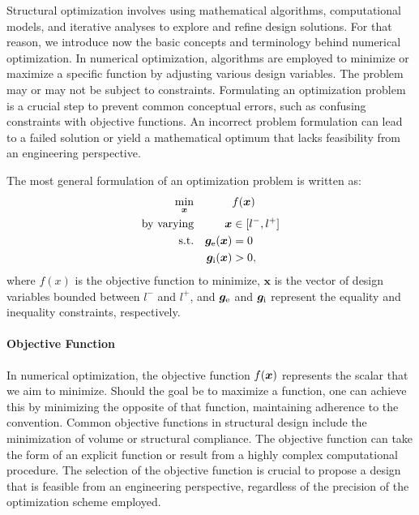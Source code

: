 Structural optimization involves using mathematical algorithms, computational models, and iterative analyses to explore and refine design solutions. For that reason, we introduce now the basic concepts and terminology behind numerical optimization. In numerical optimization, algorithms are employed to minimize or maximize a specific function by adjusting various design variables. The problem may or may not be subject to constraints. Formulating an optimization problem is a crucial step to prevent common conceptual errors, such as confusing constraints with objective functions. An incorrect problem formulation can lead to a failed solution or yield a mathematical optimum that lacks feasibility from an engineering perspective.

The most general formulation of an optimization problem is written as:
\begin{equation}
    \begin{aligned}
    \min_{\bm{x}}         && & f(\bm{x})\\
    \textrm{by varying}   && \bm{x} &\in [l^-,l^+] \\
    \textrm{s.t.}   && \bm{g}_\text{e}(\bm{x}) &= 0 \\
    && \bm{g}_\text{i}(\bm{x}) &> 0, \\
    \end{aligned}
\end{equation}
where $ f(x) $ is the objective function to minimize, $ \bm{x} $ is the vector of design variables bounded between $ l^- $ and $ l^+ $, and $\bm{g}_\text{e}$ and $\bm{g}_\text{i}$ represent the equality and inequality constraints, respectively.

\paragraph{Objective Function}
In numerical optimization, the objective function $f(\bm{x})$ represents the scalar that we aim to minimize. Should the goal be to maximize a function, one can achieve this by minimizing the opposite of that function, maintaining adherence to the convention. Common objective functions in structural design include the minimization of volume or structural compliance. The objective function can take the form of an explicit function or result from a highly complex computational procedure. The selection of the objective function is crucial to propose a design that is feasible from an engineering perspective, regardless of the precision of the optimization scheme employed.

